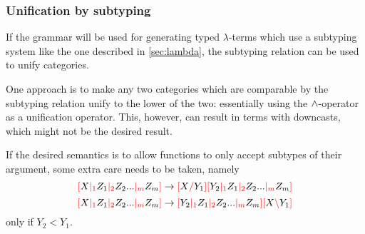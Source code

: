 \documentclass[main.tex]{subfiles}
\begin{document}
\subsubsection{Unification by subtyping}
If the grammar will be used for generating typed $\lambda$-terms which use
a subtyping system like the one described in \cref{sec:lambda}, the subtyping
relation can be used to unify categories.

One approach is to make any two categories which are comparable by the subtyping
relation unify to the lower of the two: essentially using the $\wedge$-operator
as a unification operator. This, however, can result in terms with downcasts,
which might not be the desired result.

If the desired semantics is to allow functions to only accept subtypes of
their argument, some extra care needs to be taken, namely
\[ \textcolor{red}{[} X \textcolor{red}{|_{1}} Z_1 \textcolor{red}{|_{2}} Z_2 ... \textcolor{red}{|_{m}} Z_m \textcolor{red}{]} \rightarrow \textcolor{red}{[} X \textcolor{red}{/} Y_1 \textcolor{red}{]} \textcolor{red}{[} Y_2 \textcolor{red}{|_{1}} Z_1 \textcolor{red}{|_{2}} Z_2 ... \textcolor{red}{|_{m}} Z_m \textcolor{red}{]} \]
\[ \textcolor{red}{[} X \textcolor{red}{|_{1}} Z_1 \textcolor{red}{|_{2}} Z_2 ... \textcolor{red}{|_{m}} Z_m \textcolor{red}{]} \rightarrow \textcolor{red}{[} Y_2 \textcolor{red}{|_{1}} Z_1 \textcolor{red}{|_{2}} Z_2 ... \textcolor{red}{|_{m}} Z_m \textcolor{red}{]} \textcolor{red}{[} X \textcolor{red}{\backslash} Y_1 \textcolor{red}{]} \]
only if $Y_2 \less Y_1$.
\end{document}
